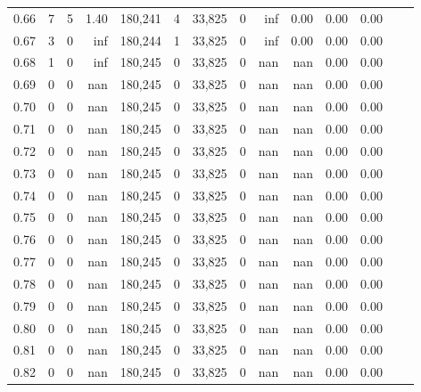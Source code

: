 \begin{tabular}{rrrrrrrrrrrrrr}
0.66 &       7 &      5 &    1.40 &  180,241 &        4 &  33,825 &       0 &   inf &  0.00 &  0.00 &      0.00 \\
0.67 &       3 &      0 &     inf &  180,244 &        1 &  33,825 &       0 &   inf &  0.00 &  0.00 &      0.00 \\
0.68 &       1 &      0 &     inf &  180,245 &        0 &  33,825 &       0 &   nan &   nan &  0.00 &      0.00 \\
0.69 &       0 &      0 &     nan &  180,245 &        0 &  33,825 &       0 &   nan &   nan &  0.00 &      0.00 \\
0.70 &       0 &      0 &     nan &  180,245 &        0 &  33,825 &       0 &   nan &   nan &  0.00 &      0.00 \\
0.71 &       0 &      0 &     nan &  180,245 &        0 &  33,825 &       0 &   nan &   nan &  0.00 &      0.00 \\
0.72 &       0 &      0 &     nan &  180,245 &        0 &  33,825 &       0 &   nan &   nan &  0.00 &      0.00 \\
0.73 &       0 &      0 &     nan &  180,245 &        0 &  33,825 &       0 &   nan &   nan &  0.00 &      0.00 \\
0.74 &       0 &      0 &     nan &  180,245 &        0 &  33,825 &       0 &   nan &   nan &  0.00 &      0.00 \\
0.75 &       0 &      0 &     nan &  180,245 &        0 &  33,825 &       0 &   nan &   nan &  0.00 &      0.00 \\
0.76 &       0 &      0 &     nan &  180,245 &        0 &  33,825 &       0 &   nan &   nan &  0.00 &      0.00 \\
0.77 &       0 &      0 &     nan &  180,245 &        0 &  33,825 &       0 &   nan &   nan &  0.00 &      0.00 \\
0.78 &       0 &      0 &     nan &  180,245 &        0 &  33,825 &       0 &   nan &   nan &  0.00 &      0.00 \\
0.79 &       0 &      0 &     nan &  180,245 &        0 &  33,825 &       0 &   nan &   nan &  0.00 &      0.00 \\
0.80 &       0 &      0 &     nan &  180,245 &        0 &  33,825 &       0 &   nan &   nan &  0.00 &      0.00 \\
0.81 &       0 &      0 &     nan &  180,245 &        0 &  33,825 &       0 &   nan &   nan &  0.00 &      0.00 \\
0.82 &       0 &      0 &     nan &  180,245 &        0 &  33,825 &       0 &   nan &   nan &  0.00 &      0.00 \\

\end{tabular}
